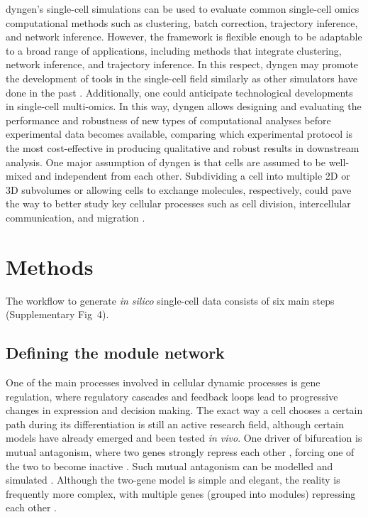 \documentclass[10pt, a4paper]{article}
\begin{document}
dyngen's single-cell simulations can be used to evaluate common
single-cell omics computational methods such as clustering, batch
correction, trajectory inference, and network inference. However, the
framework is flexible enough to be adaptable to a broad range of
applications, including methods that integrate clustering, network
inference, and trajectory inference. In this respect, dyngen may promote
the development of tools in the single-cell field similarly as other
simulators have done in the past
\cite{schaffter_genenetweaversilicobenchmark_2011,ewing_combiningtumorgenome_2015}.
Additionally, one could anticipate technological developments in
single-cell multi-omics. In this way, dyngen allows designing and
evaluating the performance and robustness of new types of computational
analyses before experimental data becomes available, comparing which
experimental protocol is the most cost-effective in producing
qualitative and robust results in downstream analysis. One major
assumption of dyngen is that cells are assumed to be well-mixed and
independent from each other. Subdividing a cell into multiple 2D or 3D
subvolumes or allowing cells to exchange molecules, respectively, could
pave the way to better study key cellular processes such as cell
division, intercellular communication, and migration
\cite{smith_spatialstochasticintracellular_2019}.

\newpage

\hypertarget{sec:dyngen-methods}{%
	\section*{Methods}\label{sec:dyngen-methods}}

The workflow to generate \emph{in silico} single-cell data consists of
six main steps (Supplementary Fig~4).

\hypertarget{sec:dyngen-modules}{%
	\subsection*{Defining the module network}\label{sec:dyngen-modules}}

One of the main processes involved in cellular dynamic processes is gene
regulation, where regulatory cascades and feedback loops lead to
progressive changes in expression and decision making. The exact way a
cell chooses a certain path during its differentiation is still an
active research field, although certain models have already emerged and
been tested \emph{in vivo}. One driver of bifurcation is mutual
antagonism, where two genes strongly repress each other
\cite{rekhtman_directinteractionhematopoietic_1999,xu_regulationbifurcatingcell_2015},
forcing one of the two to become inactive
\cite{graf_forcingcellschange_2009}. Such mutual antagonism can be
modelled and simulated
\cite{wang_quantifyingwaddingtonlandscape_2011,ferrell_bistabilitybifurcationswaddington_2012}.
Although the two-gene model is simple and elegant, the reality is
frequently more complex, with multiple genes (grouped into modules)
repressing each other \cite{yosef_dynamicregulatorynetwork_2013}.
\end{document}
